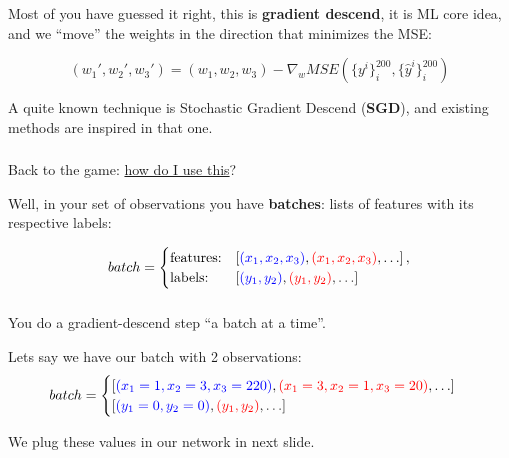 \documentclass{beamer}
\begin{document}
\begin{frame}
    \frametitle{\insertsection}
    \framesubtitle{\insertsubsection}

    Most of you have guessed it right, this is \textbf{gradient descend}, it is ML core idea, and we ``move'' the weights in the direction that minimizes the MSE:

    \begin{equation}
        (w_1',w_2',w_3') = (w_1,w_2,w_3) - \nabla_w MSE(\{y^i\}_i^{200},\{\hat{y}^i\}_i^{200})
    \end{equation}

    \vfill
    A quite known technique is Stochastic Gradient Descend (\textbf{SGD}), and existing methods are inspired in that one.
\end{frame}



\begin{frame}
    \frametitle{\insertsection}
    \framesubtitle{\insertsubsection}

    Back to the game: \underline{how do I use this}?
    \vfill

    Well, in your set of observations you have \textbf{batches}: lists of features with its respective labels:

    \begin{equation*}
        batch=\begin{cases}
            \text{features:} & \left[ {\color{blue}(x_1,x_2,x_3)}, {\color{red}(x_1,x_2,x_3)},\ldots \right],\\
            \text{labels:} & \left[ {\color{blue}(y_1,y_2)}, {\color{red}(y_1,y_2)},\ldots \right]
        \end{cases}
    \end{equation*}
\end{frame}


\begin{frame}
    \frametitle{\insertsection}
    \framesubtitle{\insertsubsection}

    You do a gradient-descend step ``a batch at a time''.

    Lets say we have our batch with 2 observations:
    \begin{equation*}
        batch=\begin{cases}
            \left[ {\color{blue}(x_1=1,x_2=3,x_3=220)}, {\color{red}(x_1=3,x_2=1,x_3=20)},\ldots \right]\\
            \left[ {\color{blue}(y_1=0,y_2=0)}, {\color{red}(y_1,y_2)},\ldots \right]
        \end{cases}
    \end{equation*}

    We plug these values in our network in next slide.
\end{frame}
\end{document}
